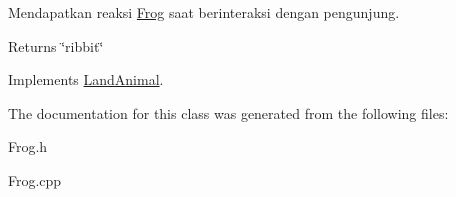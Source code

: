 Mendapatkan reaksi \hyperlink{classFrog}{Frog} saat berinteraksi dengan pengunjung. 

\begin{DoxyReturn}{Returns}
\char`\"{}ribbit\char`\"{} 
\end{DoxyReturn}


Implements \hyperlink{classLandAnimal}{Land\-Animal}.



The documentation for this class was generated from the following files\-:\begin{DoxyCompactItemize}
\item 
Frog.\-h\item 
Frog.\-cpp\end{DoxyCompactItemize}

